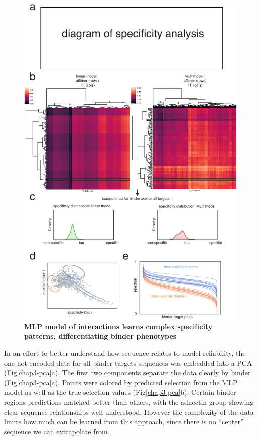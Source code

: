 \begin{figure}
\includegraphics[width=\textwidth]{figures/chapter3/20190622_figure9_specificity.pdf}
\caption[MLP model of interactions learns complex specificity patterns, differentiating binder phenotypes]{\textbf{MLP model of interactions learns complex specificity patterns, differentiating binder phenotypes}
\label{chap3-model-specificty}}
\end{figure}

In an effort to better understand how sequence relates to model reliability, the one hot encoded data for all binder-targets sequences was embedded into a PCA (Fig\ref{chap3-pca}a). The first two components separate the data clearly by binder (Fig\ref{chap3-pca}a). Points were colored by predicted selection from the MLP model as well as the true selection values (Fig\ref{chap3-pca}b). Certain binder regions predictions matched better than others, with the adnectin group showing clear sequence relationships well understood. However the complexity of the data limits how much can be learned from this approach, since there is no “center” sequence we can extrapolate from. 

